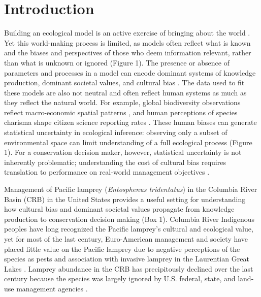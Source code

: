 \documentclass{article}
\begin{document}
\newpage

\section*{Introduction}

Building an ecological model is an active exercise of bringing about the world \parencite{schluter2025disentangling}. Yet this world-making process is limited, as models often reflect what is known and the biases and perspectives of those who deem information relevant, rather than what is unknown or ignored (Figure 1). The presence or absence of parameters and processes in a model can encode dominant systems of knowledge production, dominant societal values, and cultural bias \parencite{silver2022fish, amano2013four}. The data used to fit these models are also not neutral and often reflect human systems as much as they reflect the natural world. For example, global biodiversity observations reflect macro-economic spatial patterns \parencite{amano2013four}, and human perceptions of species charisma shape citizen science reporting rates \parencite{stoudt2022identifying}. These human biases can generate statistical uncertainty in ecological inference: observing only a subset of environmental space can limit understanding of a full ecological process \parencite{ellis2024addressing} (Figure 1). For a conservation decision maker, however, statistical uncertainty is not inherently problematic; understanding the cost of cultural bias requires translation to performance on real-world management objectives \parencite{boettiger2022forecast}. 

Management of Pacific lamprey (\textit{Entosphenus tridentatus}) in the Columbia River Basin (CRB) in the United States provides a useful setting for understanding how cultural bias and dominant societal values propagate from knowledge production to conservation decision making (Box 1). Columbia River Indigenous peoples have long recognized the Pacific lamprey’s cultural and ecological value, yet for most of the last century, Euro-American management and society have placed little value on the Pacific lamprey due to negative perceptions of the species as pests and association with invasive lamprey in the Laurentian Great Lakes \parencite{close2002ecological}. Lamprey abundance in the CRB has precipitously declined over the last century because the species was largely ignored by U.S. federal, state, and land-use management agencies \parencite{close2002ecological}.
\end{document}
